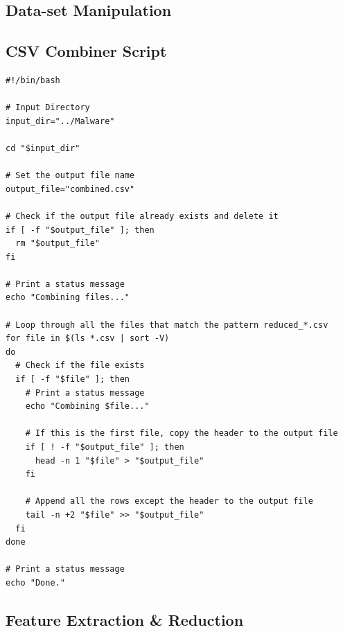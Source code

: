 \begin{appendices}




\section{Data-set Manipulation}

\subsection{CSV Combiner Script}
\label{appx: CSV Combiner Script}
\begin{lstlisting}
#!/bin/bash

# Input Directory
input_dir="../Malware"

cd "$input_dir"

# Set the output file name
output_file="combined.csv"

# Check if the output file already exists and delete it
if [ -f "$output_file" ]; then
  rm "$output_file"
fi

# Print a status message
echo "Combining files..."

# Loop through all the files that match the pattern reduced_*.csv
for file in $(ls *.csv | sort -V)
do
  # Check if the file exists
  if [ -f "$file" ]; then
    # Print a status message
    echo "Combining $file..."

    # If this is the first file, copy the header to the output file
    if [ ! -f "$output_file" ]; then
      head -n 1 "$file" > "$output_file"
    fi

    # Append all the rows except the header to the output file
    tail -n +2 "$file" >> "$output_file"
  fi
done

# Print a status message
echo "Done."
\end{lstlisting}

\newpage
\subsection{Feature Extraction \& Reduction}
\label{appx: Feature Extraction}


\end{appendices}
